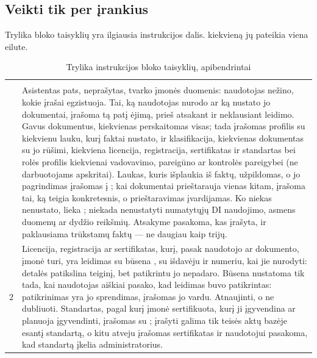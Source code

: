 \subsection{Veikti tik per įrankius}

Trylika  bloko taisyklių yra ilgiausia instrukcijos dalis. 
kiekvieną jų pateikia viena eilute.

\begin{xltabular}{\textwidth}{@{}rY@{}}
\caption{Trylika instrukcijos  bloko taisyklių, apibendrintai}\label{tab:chat:toolrules}\\
\toprule
{} &  \\
\midrule
\endfirsthead
\toprule
{} &  \\
\midrule
\endhead
\bottomrule
{} & Asistentas pats, neprašytas, tvarko įmonės duomenis: naudotojas nežino, kokie įrašai egzistuoja. Tai, ką naudotojas nurodo ar ką nustato jo dokumentai, įrašoma tą patį ėjimą, prieš atsakant ir neklausiant leidimo. Gavus dokumentus, kiekvienas perskaitomas visas; tada įrašomas profilis su kiekvienu lauku, kurį faktai nustato, ir klasifikacija, kiekvienas dokumentas su jo rūšimi, kiekviena licencija, registracija, sertifikatas ir standartas bei rolės profilis kiekvienai vadovavimo, pareigūno ar kontrolės pareigybei (ne darbuotojams apskritai). Laukas, kuris išplaukia iš faktų, užpildomas, o jo pagrindimas įrašomas į ; kai dokumentai prieštarauja vienas kitam, įrašoma tai, ką teigia konkretesnis, o prieštaravimas įvardijamas. Ko niekas nenustato, lieka ; niekada nenustatyti numatytųjų DI naudojimo, asmens duomenų ar dydžio reikšmių. Atsakyme pasakoma, kas įrašyta, ir paklausiama trūkstamų faktų --- ne daugiau kaip trijų. \\
2 & Licencija, registracija ar sertifikatas, kurį, pasak naudotojo ar dokumento, įmonė turi, yra leidimas su būsena , su išdavėju ir numeriu, kai jie nurodyti: detalės patikslina teiginį, bet patikrintu jo nepadaro. Būsena  nustatoma tik tada, kai naudotojas aiškiai pasako, kad leidimas buvo patikrintas: patikrinimas yra jo sprendimas, įrašomas jo vardu. Atnaujinti, o ne dubliuoti. Standartas, pagal kurį įmonė sertifikuota, kurį ji įgyvendina ar planuoja įgyvendinti, įrašomas su ; įrašyti galima tik teisės aktų bazėje esantį standartą, o kitu atveju įrašomas sertifikatas ir naudotojui pasakoma, kad standartą įkelia administratorius. \\

\end{xltabular}

